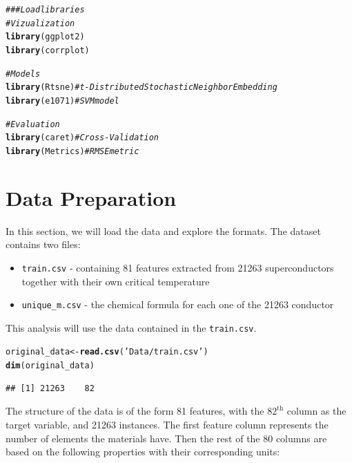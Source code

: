 \documentclass{article}\usepackage[]{graphicx}\usepackage[]{xcolor}
\makeatletter
\newcommand{\hlstr}[1]{\textcolor[rgb]{0.192,0.494,0.8}{#1}}%
\newcommand{\hlcom}[1]{\textcolor[rgb]{0.678,0.584,0.686}{\textit{#1}}}%
\newcommand{\hlstd}[1]{\textcolor[rgb]{0.345,0.345,0.345}{#1}}%
\newcommand{\hlkwb}[1]{\textcolor[rgb]{0.69,0.353,0.396}{#1}}%
\newcommand{\hlkwd}[1]{\textcolor[rgb]{0.737,0.353,0.396}{\textbf{#1}}}%
\newenvironment{kframe}{%
 \def\at@end@of@kframe{}%
 \ifinner\ifhmode%
  \def\at@end@of@kframe{\end{minipage}}%
  \begin{minipage}{\columnwidth}%
 \fi\fi%
 \def\FrameCommand##1{\hskip\@totalleftmargin \hskip-\fboxsep
 \colorbox{shadecolor}{##1}\hskip-\fboxsep
     \hskip-\linewidth \hskip-\@totalleftmargin \hskip\columnwidth}%
 \MakeFramed {\advance\hsize-\width
   \@totalleftmargin\z@ \linewidth\hsize
   \@setminipage}}%
 {\par\unskip\endMakeFramed%
 \at@end@of@kframe}
\newenvironment{knitrout}{}{} %
\makeatother
\begin{document}
\begin{knitrout}
\color{fgcolor}\begin{kframe}
\begin{alltt}
\hlcom{### Load libraries}
\hlcom{# Vizualization}
\hlkwd{library}\hlstd{(ggplot2)}
\hlkwd{library}\hlstd{(corrplot)}

\hlcom{# Models}
\hlkwd{library}\hlstd{(Rtsne)} \hlcom{# t-Distributed Stochastic Neighbor Embedding}
\hlkwd{library}\hlstd{(e1071)} \hlcom{# SVM model}

\hlcom{# Evaluation}
\hlkwd{library}\hlstd{(caret)} \hlcom{# Cross-Validation}
\hlkwd{library}\hlstd{(Metrics)} \hlcom{# RMSE metric}
\end{alltt}
\end{kframe}
\end{knitrout}


\section{Data Preparation}

In this section, we will load the data and explore the formats. 
The dataset contains two files:
\begin{itemize}
    \item{\texttt{train.csv} - containing 81 features extracted from 21263 superconductors together with their own critical temperature}
    \item{\texttt{unique\_m.csv} - the chemical formula for each one of the 21263 conductor}
\end{itemize}

This analysis will use the data contained in the \texttt{train.csv}.


\begin{knitrout}
\color{fgcolor}\begin{kframe}
\begin{alltt}
\hlstd{original_data} \hlkwb{<-} \hlkwd{read.csv}\hlstd{(}\hlstr{'Data/train.csv'}\hlstd{)}
\hlkwd{dim}\hlstd{(original_data)}
\end{alltt}
\begin{verbatim}
## [1] 21263    82
\end{verbatim}
\end{kframe}
\end{knitrout}

The structure of the data is of the form 81 features, with the $82^{\text{th}}$ column as the target variable, and 21263 instances. The first feature column represents the number of elements the materials have. Then the rest of the 80 columns are based on the following properties with their corresponding units:
\end{document}
